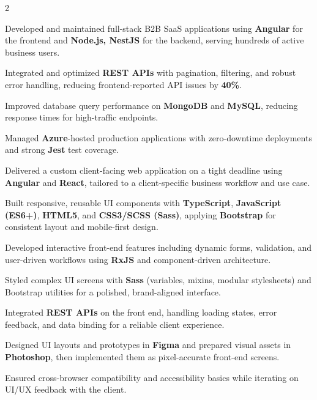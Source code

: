 \documentclass[]{deedy-resume-reversed}
\begin{document}
\begin{paracol}{2}
\vspace{2pt}
\begin{tightemize}
\item Developed and maintained full-stack B2B SaaS applications using \textbf{Angular} for the frontend and \textbf{Node.js, NestJS} for the backend, serving hundreds of active business users.
\item Integrated and optimized \textbf{REST APIs} with pagination, filtering, and robust error handling, reducing frontend-reported API issues by \textbf{40\%}.
\item Improved database query performance on \textbf{MongoDB} and \textbf{MySQL}, reducing response times for high-traffic endpoints.
\item Managed \textbf{Azure}-hosted production applications with zero-downtime deployments and strong \textbf{Jest} test coverage.
\end{tightemize}
\vspace{6pt}

\vspace{2pt}
\begin{tightemize}
\item Delivered a custom client-facing web application on a tight deadline using \textbf{Angular} and \textbf{React}, tailored to a client-specific business workflow and use case.
\item Built responsive, reusable UI components with \textbf{TypeScript}, \textbf{JavaScript (ES6+)}, \textbf{HTML5}, and \textbf{CSS3/SCSS (Sass)}, applying \textbf{Bootstrap} for consistent layout and mobile-first design.
\item Developed interactive front-end features including dynamic forms, validation, and user-driven workflows using \textbf{RxJS} and component-driven architecture.
\item Styled complex UI screens with \textbf{Sass} (variables, mixins, modular stylesheets) and Bootstrap utilities for a polished, brand-aligned interface.
\item Integrated \textbf{REST APIs} on the front end, handling loading states, error feedback, and data binding for a reliable client experience.
\item Designed UI layouts and prototypes in \textbf{Figma} and prepared visual assets in \textbf{Photoshop}, then implemented them as pixel-accurate front-end screens.
\item Ensured cross-browser compatibility and accessibility basics while iterating on UI/UX feedback with the client.
\end{tightemize}


\end{paracol}
\end{document}
